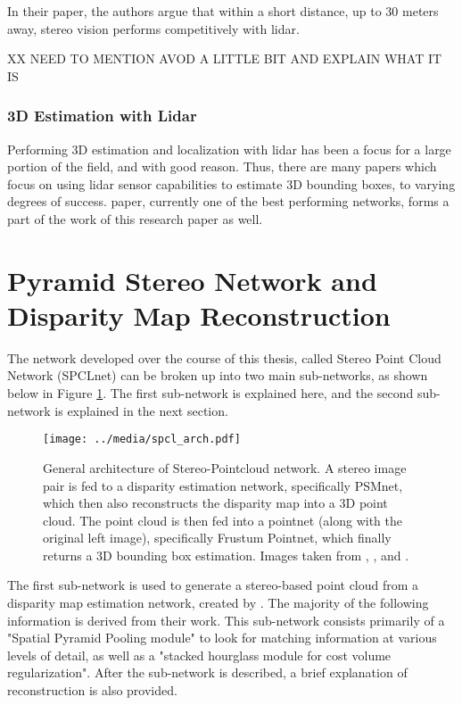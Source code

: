 In their paper, the authors argue that within a short distance, up to 30 meters away, stereo vision performs competitively with lidar.

XX NEED TO MENTION AVOD A LITTLE BIT AND EXPLAIN WHAT IT IS

\subsubsection{3D Estimation with Lidar}
Performing 3D estimation and localization with lidar has been a focus for a large portion of the field, and with good reason. Thus, there are many papers which focus on using lidar sensor capabilities to estimate 3D bounding boxes, to varying degrees of success. \cite{qi_frustum_2017} paper, currently one of the best performing networks, forms a part of the work of this research paper as well.



\newpage
\section{Pyramid Stereo Network and Disparity Map Reconstruction} %
The network developed over the course of this thesis, called Stereo Point Cloud Network (SPCLnet) can be broken up into two main sub-networks, as shown below in Figure \ref{spcl_arch}. The first sub-network is explained here, and the second sub-network is explained in the next section.

\begin{figure}[ht]
	\centering
	\texttt{[image: ../media/spcl\_arch.pdf]}
	\caption{General architecture of Stereo-Pointcloud network. A stereo image pair is fed to a disparity estimation network, specifically PSMnet, which then also reconstructs the disparity map into a 3D point cloud. The point cloud is then fed into a pointnet (along with the original left image), specifically Frustum Pointnet, which finally returns a 3D bounding box estimation. Images taken from \cite{geiger_are_2012}, \cite{chang_pyramid_2018}, and \cite{qi_frustum_2017}.}
	\label{spcl_arch}
\end{figure}

The first sub-network is used to generate a stereo-based point cloud from a disparity map estimation network, created by \cite{chang_pyramid_2018}. The majority of the following information is derived from their work. This sub-network consists primarily of a "Spatial Pyramid Pooling module" to look for matching information at various levels of detail, as well as a "stacked hourglass module for cost volume regularization". After the sub-network is described, a brief explanation of reconstruction is also provided. 

